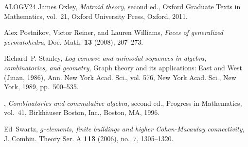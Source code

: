 \begin{thebibliography}{ALOGV24}
James Oxley, \emph{Matroid theory}, second ed., Oxford Graduate Texts in Mathematics, vol.~21, Oxford University Press, Oxford, 2011. 

Alex Postnikov, Victor Reiner, and Lauren Williams, \emph{Faces of generalized permutohedra}, Doc. Math. \textbf{13} (2008), 207--273. 

Richard~P. Stanley, \emph{Log-concave and unimodal sequences in algebra, combinatorics, and geometry}, Graph theory and its applications: {E}ast and {W}est ({J}inan, 1986), Ann. New York Acad. Sci., vol. 576, New York Acad. Sci., New York, 1989, pp.~500--535. 

\bysame, \emph{Combinatorics and commutative algebra}, second ed., Progress in Mathematics, vol.~41, Birkh\"auser Boston, Inc., Boston, MA, 1996. 

Ed~Swartz, \emph{{$g$}-elements, finite buildings and higher {C}ohen-{M}acaulay connectivity}, J. Combin. Theory Ser. A \textbf{113} (2006), no.~7, 1305--1320. 

\end{thebibliography}
